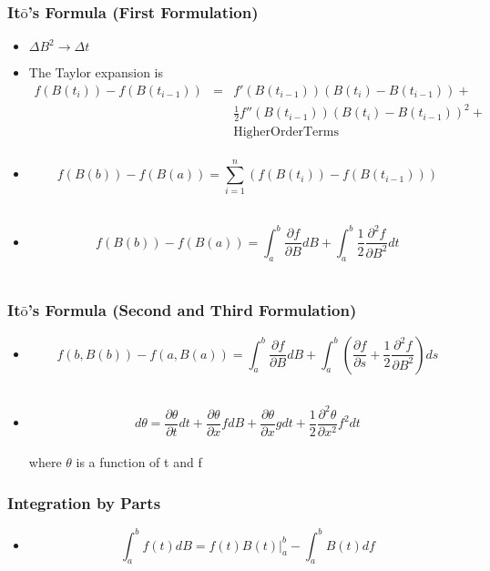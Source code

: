 \begin{frame}
  \frametitle{It$\mathrm{\bar{o}}$'s Formula (First Formulation)}
  \begin{itemize}
  \item $\Delta B^2 \to \Delta t$\\
  \item  The Taylor expansion is
  \begin{eqnarray*}
    f(B(t_i))-f(B(t_{i-1}))&=&f'(B(t_{i-1}))(B(t_i)-B(t_{i-1}))+\\
    & &\frac{1}{2}f''(B(t_{i-1}))(B(t_i)-B(t_{i-1}))^2+\\
    & &\mathrm{Higher Order Terms}\\
  \end{eqnarray*}
  \item $$f(B(b))-f(B(a))=\sum_{i=1}^{n}(f(B(t_i))-f(B(t_{i-1})))$$\\
  \item $$f(B(b))-f(B(a))=\int_{a}^{b}{\frac{\partial f}{\partial B} dB}+\int_{a}^{b}{\frac{1}{2} \frac{\partial^2 f}{\partial B^2} dt} $$\\
  \end{itemize}
\end{frame}

\begin{frame}
  \frametitle{It$\mathrm{\bar{o}}$'s Formula (Second and Third Formulation)}
  \begin{itemize}
  \item  $$f(b,B(b))-f(a,B(a))=\int_{a}^{b}{\frac{\partial f}{\partial B} dB}+\int_{a}^{b}{(\frac{\partial f}{\partial s}+\frac{1}{2}\frac{\partial ^2 f}{\partial B^2}) ds}$$\\
  \item  $$d\theta=\frac{\partial\theta}{\partial t}dt+\frac{\partial\theta}{\partial x}f dB+\frac{\partial\theta}{\partial x}g dt+\frac{1}{2}\frac{\partial^2\theta}{\partial x^2}f^2dt$$\\
  where $\theta$ is a function of t and f
  \end{itemize}
  
\end{frame}

\begin{frame}
  \frametitle{Integration by Parts}
  \begin{itemize}
  \item $$\int_{a}^{b}{f(t)dB}=f(t)B(t)|_{a}^{b}-\int_{a}^{b}{B(t)df}$$
  \end{itemize}

\end{frame}






\
